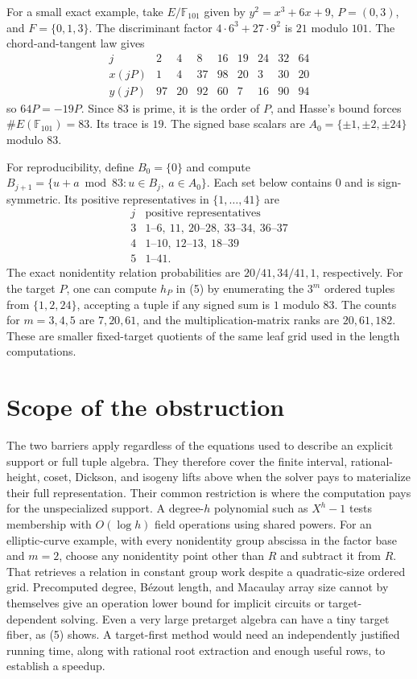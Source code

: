 \documentclass[11pt]{article}
\begin{document}
For a small exact example, take \(E/\mathbb F_{101}\) given by
\(y^2=x^3+6x+9\), \(P=(0,3)\), and \(F=\{0,1,3\}\).
The discriminant factor \(4\cdot6^3+27\cdot9^2\) is \(21\) modulo \(101\). The chord-and-tangent law gives
\[
\begin{array}{c|rrrrrrrr}
j&2&4&8&16&19&24&32&64\\ \hline
x(jP)&1&4&37&98&20&3&30&20\\
y(jP)&97&20&92&60&7&16&90&94
\end{array}
\]
so \(64P=-19P\). Since \(83\) is prime, it is the order of \(P\), and Hasse's bound forces \(\#E(\mathbb F_{101})=83\). Its trace is \(19\). The signed base scalars are \(A_0=\{\pm 1,\pm 2,\pm 24\}\) modulo \(83\).

For reproducibility, define \(B_0=\{0\}\) and compute \(B_{j+1}=\{u+a\bmod 83:u\in B_j,\ a\in A_0\}\). Each set below contains \(0\) and is sign-symmetric. Its positive representatives in \(\{1,\dots,41\}\) are
\[
\begin{array}{c|l}
j & \text{positive representatives}\\ \hline
3 & 1\text{--}6,\ 11,\ 20\text{--}28,\ 33\text{--}34,\ 36\text{--}37\\
4 & 1\text{--}10,\ 12\text{--}13,\ 18\text{--}39\\
5 & 1\text{--}41 .
\end{array}
\]
The exact nonidentity relation probabilities are \(20/41,34/41,1\), respectively. For the target \(P\), one can compute \(h_P\) in (5) by enumerating the \(3^m\) ordered tuples from \(\{1,2,24\}\), accepting a tuple if any signed sum is \(1\) modulo \(83\). The counts for \(m=3,4,5\) are \(7,20,61\), and the multiplication-matrix ranks are \(20,61,182\). These are smaller fixed-target quotients of the same leaf grid used in the length computations.

\section{Scope of the obstruction}

The two barriers apply regardless of the equations used to describe an explicit support or full tuple algebra. They therefore cover the finite interval, rational-height, coset, Dickson, and isogeny lifts above when the solver pays to materialize their full representation. Their common restriction is where the computation pays for the unspecialized support. A degree-\(h\) polynomial such as \(X^h-1\) tests membership with \(O(\log h)\) field operations using shared powers. For an elliptic-curve example, with every nonidentity group abscissa in the factor base and \(m=2\), choose any nonidentity point other than \(R\) and subtract it from \(R\). That retrieves a relation in constant group work despite a quadratic-size ordered grid. Precomputed degree, B\'ezout length, and Macaulay array size cannot by themselves give an operation lower bound for implicit circuits or target-dependent solving. Even a very large pretarget algebra can have a tiny target fiber, as (5) shows. A target-first method would need an independently justified running time, along with rational root extraction and enough useful rows, to establish a speedup.
\end{document}
